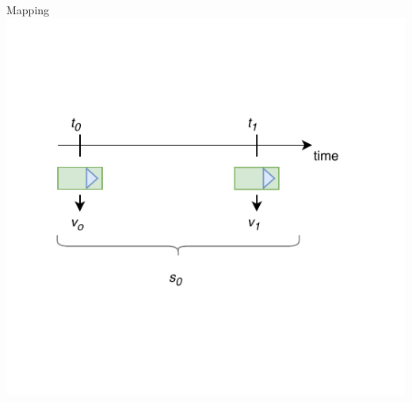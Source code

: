 \documentclass{beamer}
\begin{document}
\begin{frame}{Mapping}
\centering
\includegraphics[page=7,scale=0.8]{sources/Rounting_1.pdf}
\end{frame}
\end{document}
